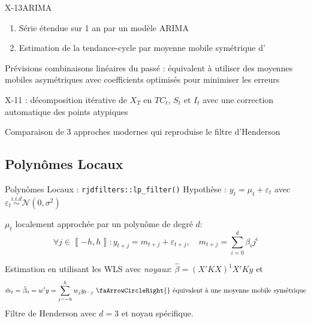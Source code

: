 \documentclass[10pt,xcolor=table,color={dvipsnames,usenames},ignorenonframetext,usepdftitle=false,french]{beamer}
\newcommand\1{\mathds{1}}
\begin{document}
\begin{frame}{X-13ARIMA}
\protect\hypertarget{x-13arima}{}
\begin{enumerate}
\item
  Série étendue sur 1 an par un modèle ARIMA
\item
  Estimation de la tendance-cycle par moyenne mobile symétrique
  d'
\end{enumerate}

\pause

\faArrowCircleRight{} Prévisions combinaisons linéaires du passé :
équivalent à utiliser des moyennes mobiles asymétriques avec
coefficients optimisés pour minimiser les erreurs

\bigskip

\pause

\faArrowCircleRight{} X-11 : décomposition itérative de \(X_T\) en
\(TC_t\), \(S_t\) et \(I_t\) avec une correction automatique des points
atypiques

\bigskip

\pause

\faArrowCircleRight{} Comparaison de 3 approches modernes qui reproduise
le filtre d'Henderson
\end{frame}

\hypertarget{polynuxf4mes-locaux}{%
\subsection{Polynômes Locaux}\label{polynuxf4mes-locaux}}

\begin{frame}{Polynômes Locaux : \texttt{rjdfilters::lp\_filter()}}
\protect\hypertarget{polynuxf4mes-locaux-rjdfilterslp_filter}{}
Hypothèse : \(y_t=\mu_t+\varepsilon_t\) avec
\(\varepsilon_t\overset{i.i.d}{\sim}\mathcal N(0,\sigma^2)\)

\(\mu_t\) localement approchée par un polynôme de degré \(d\): \[
\forall j\in\left\llbracket -h,h\right\rrbracket : y_{t+j}=m_{t+j}+\varepsilon_{t+j},\quad m_{t+j}=\sum_{i=0}^{d}\beta_{i}j^{i}
\]

\pause

Estimation en utilisant les WLS avec \emph{noyaux}:
\(\hat{\beta}=(X'KX)^{1}X'Ky\) et \[
\hat{m}_{t}=\hat\beta_0=w'y=\sum_{j=-h}^{h}w_{j}y_{t-j}
\text{ \faArrowCircleRight{} équivalent à une moyenne mobile symétrique}
\] \faArrowCircleRight{} Filtre de Henderson avec \(d=3\) et noyau
spécifique.
\end{frame}
\end{document}

